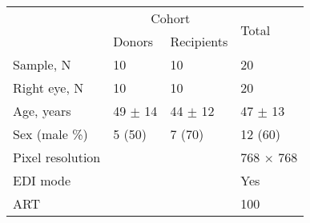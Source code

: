 \begin{tabular}{llll}
\toprule
\multirow{2}{*}{} & \multicolumn{2}{c}{Cohort} & \multirow{2}{*}{Total} \\
\cmidrule(l){2-3}
 & Donors & Recipients &  \\
 \midrule
Sample, N & 10 & 10 & 20 \\
Right eye, N  & 10 & 10 & 20 \\
Age, years & 49 $\pm$ 14 & 44 $\pm$ 12 & 47 $\pm$ 13 \\
Sex (male \%) & 5 (50) & 7 (70) & 12 (60)\\
Pixel resolution & & & 768 $\times$ 768 \\
\acrshort{EDI} mode & & & Yes \\
\acrshort{ART} & & & 100 \\
\bottomrule
\end{tabular}
